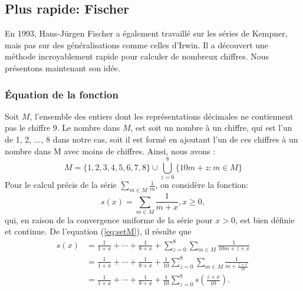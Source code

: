 \subsection{Plus rapide: Fischer}
En 1993, Hans-Jürgen Fischer \cite{fischer} a également travaillé sur les séries
de Kempner, mais pas sur des généralisations comme celles d'Irwin. Il a
découvert une méthode incroyablement rapide pour calculer de nombreux chiffres.
Nous présentons maintenant son idée.
\subsubsection{Équation de la fonction}
Soit $M$, l'ensemble des entiers dont les repr\'esentations d\'ecimales ne
contiennent pas le chiffre 9. Le nombre dans $M$, est soit un nombre à un
chiffre, qui est l'un de 1, 2, $\ldots$, 8 dans notre cas, soit il est formé en
ajoutant l'un de ces chiffres à un nombre dans M avec moins de chiffres. Ainsi,
nous avons :
\begin{equation}
	M = \{1,2,3,4,5,6,7,8\} \cup \bigcup_{z=0}^8\{10m+z : m\in M\}
	\label{eq:setM}
\end{equation}
Pour le calcul pr\'ecis de la s\'erie \( \sum_{m \in M} \frac{1}{m} \), on
consid\`ere la fonction:
\[ 
	s(x) = \sum_{m\in M} \frac{1}{m+x}, x\ge 0, 
\]
qui, en raison de la convergence uniforme de la s\'erie pour $x>0$, est bien
d\'efinie et continue. De l'equation (\ref{eq:setM}), il r\'esulte que
\begin{equation*}
	\begin{split}
		s(x) &= \frac{1}{1+x} + \cdots + \frac{1}{8+x} + \sum_{z=0}^8
		\sum_{m\in M} \frac{1}{10m+z+x} \\
			 &= \frac{1}{1+x} + \cdots + \frac{1}{8+x} + \frac{1}{10}
			 \sum_{z=0}^8\sum_{m\in M} \frac{1}{m+\frac{z+x}{10}} \\
			 &= \frac{1}{1+x} + \cdots + \frac{1}{8+x} +
			 \frac{1}{10}\sum_{z=0}^8 s(\frac{z+x}{10}).
	\end{split}
\end{equation*}
